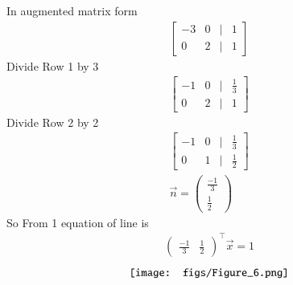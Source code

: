 \documentclass[journal]{IEEEtran}
\begin{document}
In augmented matrix form\\
\begin{align}
\begin{bmatrix}
-3 & 0 & \big| & 1 \\
0 & 2 & \big| & 1
\end{bmatrix}
\end{align}
Divide Row 1 by 3
\begin{align}
\begin{bmatrix}
-1 & 0 & \big| & \frac{1}{3}\\
0 &  2  & \big| & 1
\end{bmatrix}
\end{align}
Divide Row 2 by 2
\begin{align}
\begin{bmatrix}
  -1 & 0 & \big| & \frac{1}{3}\\
  0  &  1 & \big| & \frac{1}{2}
\end{bmatrix}\\
 \vec{n}=\begin{pmatrix}
     \frac{-1}{3}\\ \frac{1}{2}
 \end{pmatrix}
\end{align}
So From 1 equation of line is
\begin{align}
\begin{pmatrix}
    \frac{-1}{3} & \frac{1}{2}
\end{pmatrix}^\top \vec{x}=1
\end{align}
\begin{align}
\centering
\texttt{[image: figs/Figure\_6.png]}       
\end{align}
\end{document}
